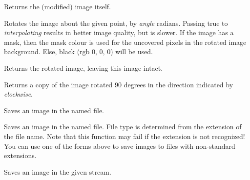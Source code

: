 Returns the (modified) image itself.




\label{wximagerotate}


Rotates the image about the given point, by {\it angle} radians. Passing true
to {\it interpolating} results in better image quality, but is slower. If the
image has a mask, then the mask colour is used for the uncovered pixels in the
rotated image background. Else, black (rgb 0, 0, 0) will be used.

Returns the rotated image, leaving this image intact.


\label{wximagerotate90}


Returns a copy of the image rotated 90 degrees in the direction
indicated by {\it clockwise}.


\label{wximagesavefile}



Saves an image in the named file.


Saves an image in the named file. File type is determined from the extension of the
file name. Note that this function may fail if the extension is not recognized! You
can use one of the forms above to save images to files with non-standard extensions.



Saves an image in the given stream.



